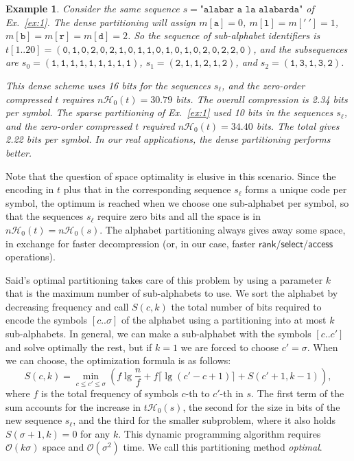 \documentclass[11pt]{article}
\newtheorem{example}{Example}
\newcommand{\Oh}[1]
    {\ensuremath{\mathcal{O}\left( {#1} \right)}}
\newcommand{\access}
    {\ensuremath{\mathsf{access}}}
\newcommand{\rank}
    {\ensuremath{\mathsf{rank}}}
\newcommand{\select}
    {\ensuremath{\mathsf{select}}}
\newcommand{\HH}{\mathcal{H}}
\newcommand{\Ho}{\HH_0}
\newcommand{\mapping}{\ensuremath{{m}}}
\begin{document}
\begin{example} \label{ex:dense}
Consider the same sequence $s = \texttt{"alabar a la alabarda"}$ of 
Ex.~\ref{ex:1}. The dense partitioning will assign $\mapping[\mathtt{a}] = 0$,
$\mapping[\mathtt{l}] = \mapping[\mathtt{'\ '}] = 1$,
$\mapping[\mathtt{b}] = \mapping[\mathtt{r}] = \mapping[\mathtt{d}] = 2$. 
So the sequence of sub-alphabet identifiers is $t[1..20] =
(\mathtt{0,1,0,2,0,2,1,0,1,1,0,1,0,1,0,2,0,2,2,0})$, and the
subsequences are $s_0 = (\mathtt{1,1,1,1,1,1,1,1,1})$, 
$s_1 = (\mathtt{2,1,1,2,1,2})$, and $s_2 = (\mathtt{1,3,1,3,2})$.

This dense scheme uses 16 bits for the sequences $s_\ell$, and the
zero-order compressed $t$ requires $n\Ho(t) = 30.79$ bits. The overall
compression is 2.34 bits per symbol. The sparse partitioning of 
Ex.~\ref{ex:1} used 10 bits in the sequences $s_\ell$, and the zero-order
compressed $t$ required $n\Ho(t) = 34.40$ bits. The total gives
2.22 bits per symbol. In our real applications, the dense partitioning
performs better.
\end{example}

Note that the question of space optimality is elusive in this scenario.
Since the encoding in $t$ plus that in the corresponding sequence $s_\ell$
forms a unique code per symbol, the optimum is reached when we choose one
sub-alphabet per symbol, so that the sequences $s_\ell$ require zero bits
and all the space is in $n\Ho(t) = n\Ho(s)$. The alphabet partitioning
always gives away some space, in exchange for faster decompression (or, in 
our case, faster $\rank$/$\select$/$\access$ operations).

Said's optimal partitioning \cite{Sai05} takes care of this problem by using
a parameter $k$ that is the maximum number of sub-alphabets to use. 
We sort the alphabet by decreasing frequency and call $S(c,k)$ the total number
of bits required to encode the symbols $[c..\sigma]$ of the alphabet using 
a partitioning into at most $k$ sub-alphabets. In general, we can make a
sub-alphabet with the symbols $[c..c']$ and solve optimally the rest, but if
$k=1$ we are forced to choose $c'=\sigma$. When we can choose, the optimization
formula is as follows: 
\[  S(c,k) = \min_{c \le c' \le \sigma} \left( f \lg\frac{n}{f} + 
				      f \lceil \lg (c'-c+1) \rceil +
				      S(c'+1,k-1) \right),
\]
where $f$ is the total frequency of symbols $c$-th to $c'$-th in $s$. The first 
term of the sum accounts for the increase in $t\Ho(s)$, the second for
the size in bits of the new sequence $s_\ell$, and the third for the smaller
subproblem, where it also holds $S(\sigma+1,k)=0$ for any $k$. This dynamic 
programming algorithm requires $\Oh{k\sigma}$ space and $\Oh{\sigma^2}$ time.
We call this partitioning method {\em optimal}.
\end{document}
